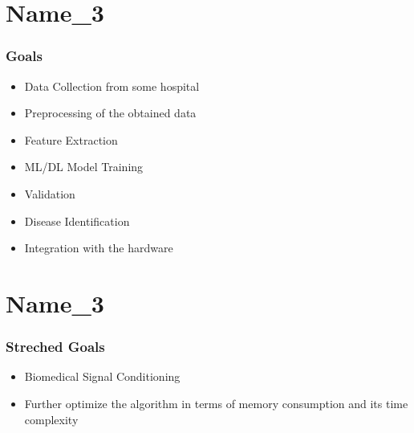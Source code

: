 \documentclass{beamer}
\begin{document}

\section{Name\_3}
\begin{frame}[allowframebreak]
\frametitle{Goals}\small

\begin{itemize}
    \item {Data Collection from some hospital}
    \item {Preprocessing of the obtained data}
    \item{Feature Extraction}
    \item{ML/DL Model Training}
    \item{Validation}
    \item{Disease Identification}
    \item{Integration with the hardware}
\end{itemize}
\end{frame}


\section{Name\_3}
\begin{frame}[allowframebreak]
\frametitle{Streched Goals}\small

\begin{itemize}
    
    \item{Biomedical Signal Conditioning}
    \item{Further optimize the algorithm in terms of memory consumption and its time complexity}
\end{itemize}
\end{frame}
\end{document}
